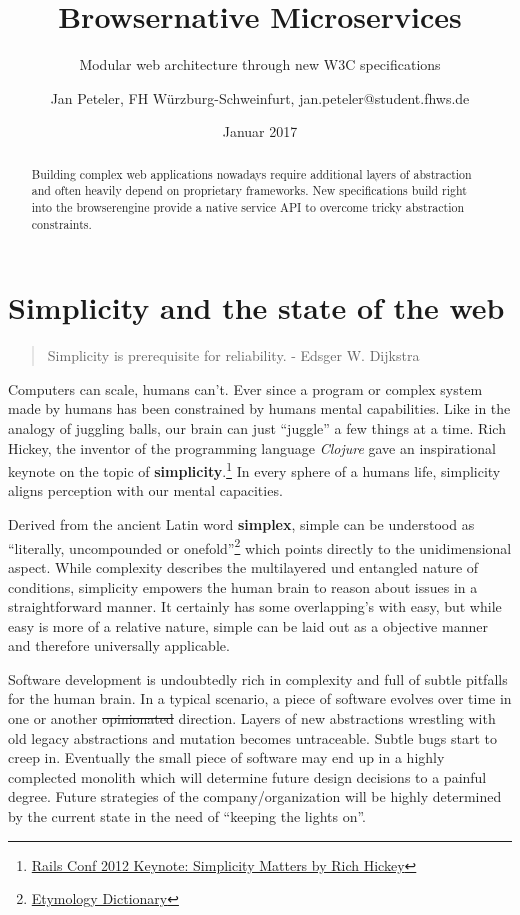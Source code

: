 \documentclass[]{assets/latex/ieee}
\title{Browsernative Microservices}
\subtitle{Modular web architecture through new W3C specifications}
\author{Jan Peteler, FH Würzburg-Schweinfurt, jan.peteler@student.fhws.de}
\date{Januar 2017}
\begin{document}
\maketitle
\begin{abstract}
Building complex web applications nowadays require additional layers of
abstraction and often heavily depend on proprietary frameworks. New
specifications build right into the browserengine provide a native
service API to overcome tricky abstraction constraints.
\end{abstract}

\section{Simplicity and the state of the
web}\label{simplicity-and-the-state-of-the-web}

\begin{quote}
Simplicity is prerequisite for reliability. - Edsger W. Dijkstra
\end{quote}

Computers can scale, humans can't. Ever since a program or complex
system made by humans has been constrained by humans mental
capabilities. Like in the analogy of juggling balls, our brain can just
``juggle'' a few things at a time. Rich Hickey, the inventor of the
programming language \emph{Clojure} gave an inspirational keynote on the
topic of \textbf{simplicity}.\footnote{\href{https://www.youtube.com/watch?v=rI8tNMsozo0\&t=46s}{Rails
  Conf 2012 Keynote: Simplicity Matters by Rich Hickey}} In every sphere
of a humans life, simplicity aligns perception with our mental
capacities.

Derived from the ancient Latin word \textbf{simplex}, simple can be
understood as ``literally, uncompounded or onefold''\footnote{\href{http://www.etymonline.com/index.php?term=simple}{Etymology
  Dictionary}} which points directly to the unidimensional aspect. While
complexity describes the multilayered und entangled nature of
conditions, simplicity empowers the human brain to reason about issues
in a straightforward manner. It certainly has some overlapping's with
easy, but while easy is more of a relative nature, simple can be laid
out as a objective manner and therefore universally applicable.

Software development is undoubtedly rich in complexity and full of
subtle pitfalls for the human brain. In a typical scenario, a piece of
software evolves over time in one or another \sout{opinionated}
direction. Layers of new abstractions wrestling with old legacy
abstractions and mutation becomes untraceable. Subtle bugs start to
creep in. Eventually the small piece of software may end up in a highly
complected monolith which will determine future design decisions to a
painful degree. Future strategies of the company/organization will be
highly determined by the current state in the need of ``keeping the
lights on''.
\end{document}
